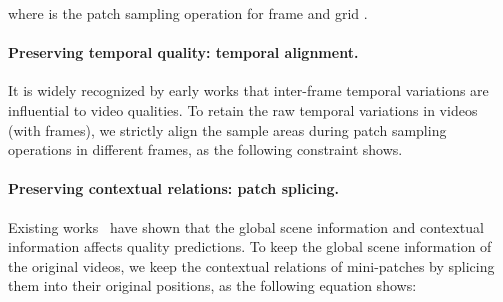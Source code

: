 \documentclass[runningheads]{llncs}
\begin{document}
where  is the patch sampling operation for frame  and grid .

\paragraph{Preserving temporal quality: temporal alignment.} It is widely recognized by early works \cite{deepvqa,tlvqm,pvq} that inter-frame temporal variations are influential to video qualities. To retain the raw temporal variations in videos (with  frames), we strictly align the sample areas during patch sampling operations  in different frames, as the following constraint shows.



\paragraph{Preserving contextual relations: patch splicing.} Existing works~\cite{sfa,vsfa,mlsp} have shown that the global scene information and contextual information affects quality predictions. To keep the global scene information of the original videos, we keep the contextual relations of mini-patches by splicing them into their original positions, as the following equation shows:
\end{document}
